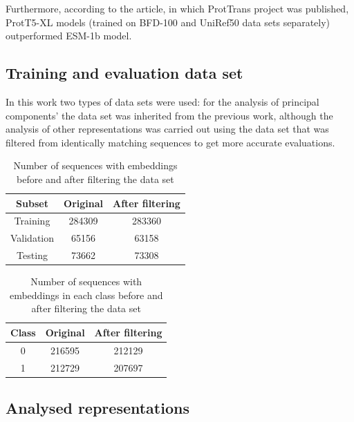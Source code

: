 \documentclass[12pt]{article}
\begin{document}
	Furthermore, according to the article, in which ProtTrans
	project was published, ProtT5-XL models (trained on BFD-100 
	and UniRef50 data sets separately) 
	outperformed ESM-1b \cite{rives2021biological} model.

	\subsection{Training and evaluation data set}

	In this work two types of data sets were used: for the analysis of 
	principal components' the data set was inherited from the previous 
	work, although the analysis of other representations was carried 
	out using the data set that was filtered from identically matching 
	sequences to get more accurate evaluations.

	\begin{table}[h!]
		\caption{Number of sequences with embeddings before and after 
		filtering the data set}
		\vspace{0.2cm}
		\centering
		\begin{tabular}{ | c | c c | }
			\hline 
			Subset & Original & After filtering \\
			\hline 
			Training & 284309 & 283360 \\
			Validation & 65156 & 63158 \\
			Testing & 73662 & 73308 \\
			\hline    
		\end{tabular}
		\label{table:numberEmbeddings}
	\end{table}

	\begin{table}[h!]
		\caption{Number of sequences with embeddings in each class 
		before and after filtering the data set}
		\vspace{0.2cm}
		\centering
		\begin{tabular}{ | c | c c | }
			\hline 
			Class & Original & After filtering \\
			\hline 
			0 & 216595 & 212129 \\
			1 & 212729 & 207697 \\
			\hline    
		\end{tabular}
		\label{table:numberEmbeddingsClasses}
	\end{table}

	\newpage

	\subsection{Analysed representations}
	\label{analysedRepresentations}
\end{document}
